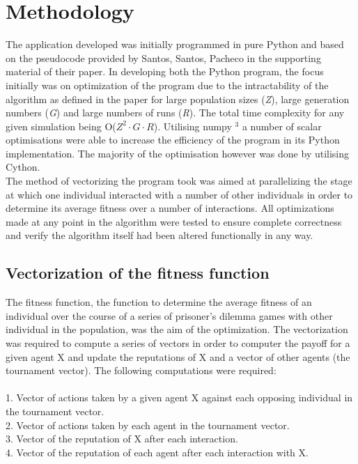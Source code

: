 \documentclass[10pt,a4paper]{article}
\begin{document}
\section{Methodology}
The application developed was initially programmed in pure Python and based on the pseudocode provided by Santos, Santos, Pacheco in the supporting material of their paper.
In developing both the Python program, the focus initially was on optimization of the program due to the intractability of the algorithm as defined in the paper for large population sizes (\emph{Z}), large generation numbers (\emph{G}) and large numbers of runs (\emph{R}).
The total time complexity for any given simulation being O(\emph{$Z^{2} \cdot G\cdot R$}).
Utilising numpy $^{3}$ a number of scalar optimisations were able to increase the efficiency of the program in its Python implementation. 
The majority of the optimisation however was done by utilising Cython.
\\
The method of vectorizing the program took was aimed at parallelizing the stage at which one individual interacted with a number of other individuals in order to determine its average fitness over a number of interactions. 
All optimizations made at any point in the algorithm were tested to ensure complete correctness and verify the algorithm itself had been altered functionally in any way.

\subsection{Vectorization of the fitness function}
The fitness function, the function to determine the average fitness of an individual over the course of a series of prisoner's dilemma games with other individual in the population, was the aim of the optimization. 
The vectorization was required to compute a series of vectors in order to computer the payoff for a given agent X and update the reputations of X and a vector of other agents (the tournament vector).
The following computations were required:
\\
\\ 1. Vector of actions taken by a given agent X against each opposing individual in the tournament vector.
\\ 2. Vector of actions taken by each agent in the tournament vector.
\\ 3. Vector of the reputation of X after each interaction.
\\ 4. Vector of the reputation of each agent after each interaction with X. \\
\end{document}
